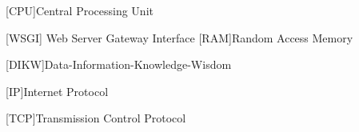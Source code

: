 \begin{acronym}[RELAX NG]
	[CPU]{Central Processing Unit}
	
	[WSGI]{ Web Server Gateway Interface }
	[RAM]{Random Access Memory}
	
	[DIKW]{Data-Information-Knowledge-Wisdom}
	
	
	[IP]{Internet Protocol}
	
	[TCP]{Transmission Control Protocol}
	
	
\end{acronym}
